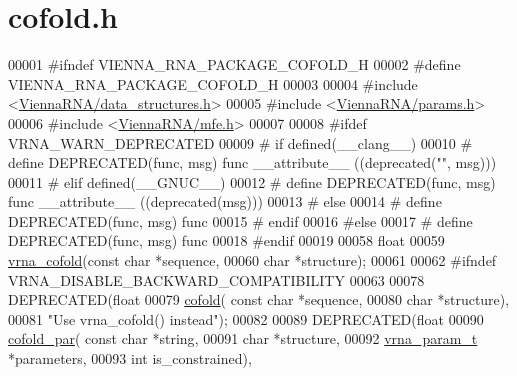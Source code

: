\hypertarget{cofold_8h_source}{}\section{cofold.\+h}
\label{cofold_8h_source}

\begin{DoxyCode}
00001 \textcolor{preprocessor}{#ifndef VIENNA\_RNA\_PACKAGE\_COFOLD\_H}
00002 \textcolor{preprocessor}{#define VIENNA\_RNA\_PACKAGE\_COFOLD\_H}
00003 
00004 \textcolor{preprocessor}{#include <\hyperlink{data__structures_8h}{ViennaRNA/data\_structures.h}>}
00005 \textcolor{preprocessor}{#include <\hyperlink{params_8h}{ViennaRNA/params.h}>}
00006 \textcolor{preprocessor}{#include <\hyperlink{mfe_8h}{ViennaRNA/mfe.h}>}
00007 
00008 \textcolor{preprocessor}{#ifdef VRNA\_WARN\_DEPRECATED}
00009 \textcolor{preprocessor}{# if defined(\_\_clang\_\_)}
00010 \textcolor{preprocessor}{#  define DEPRECATED(func, msg) func \_\_attribute\_\_ ((deprecated("", msg)))}
00011 \textcolor{preprocessor}{# elif defined(\_\_GNUC\_\_)}
00012 \textcolor{preprocessor}{#  define DEPRECATED(func, msg) func \_\_attribute\_\_ ((deprecated(msg)))}
00013 \textcolor{preprocessor}{# else}
00014 \textcolor{preprocessor}{#  define DEPRECATED(func, msg) func}
00015 \textcolor{preprocessor}{# endif}
00016 \textcolor{preprocessor}{#else}
00017 \textcolor{preprocessor}{# define DEPRECATED(func, msg) func}
00018 \textcolor{preprocessor}{#endif}
00019 
00058 \textcolor{keywordtype}{float}
00059 \hyperlink{group__mfe__cofold_ga9ef3a297201dbf838a8daff2b45c0c82}{vrna\_cofold}(\textcolor{keyword}{const} \textcolor{keywordtype}{char} *sequence,
00060             \textcolor{keywordtype}{char} *structure);
00061 
00062 \textcolor{preprocessor}{#ifndef VRNA\_DISABLE\_BACKWARD\_COMPATIBILITY}
00063 
00078 DEPRECATED(\textcolor{keywordtype}{float}
00079 \hyperlink{group__mfe__cofold_gabc8517f22cfe70595ee81fc837910d52}{cofold}( \textcolor{keyword}{const} \textcolor{keywordtype}{char} *sequence,
00080         \textcolor{keywordtype}{char} *structure),
00081         \textcolor{stringliteral}{"Use vrna\_cofold() instead"});
00082 
00089 DEPRECATED(\textcolor{keywordtype}{float}
00090 \hyperlink{group__mfe__cofold_ga7612cfeeb1b793f1e4179b1eb53df1f3}{cofold\_par}( \textcolor{keyword}{const} \textcolor{keywordtype}{char} *\textcolor{keywordtype}{string},
00091             \textcolor{keywordtype}{char} *structure,
00092             \hyperlink{group__energy__parameters_structvrna__param__s}{vrna\_param\_t} *parameters,
00093             \textcolor{keywordtype}{int} is\_constrained),

\end{DoxyCode}
